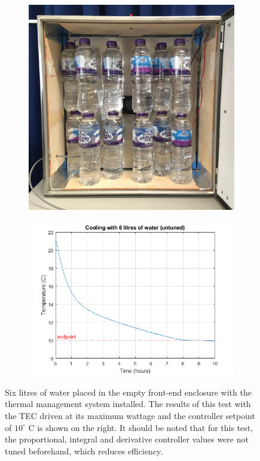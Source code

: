 \begin{figure}
    \centering
    \centering
    \begin{subfigure}{.4\textwidth}
        \centering
        \includegraphics[width=\linewidth]{water}
    \end{subfigure}
    \hfill
    \begin{subfigure}{.55\textwidth}
    \centering
        \includegraphics[width=\linewidth]{water_results}
    \end{subfigure}
    \caption{Six litres of water placed in the empty front-end enclosure with the thermal management system installed. The results of this test with the TEC driven at its maximum wattage and the controller setpoint of $10^\circ$ C is shown on the right. It should be noted that for this test, the proportional, integral and derivative controller values were not tuned beforehand, which reduces efficiency.}
    \label{fig:water_test}
\end{figure}


